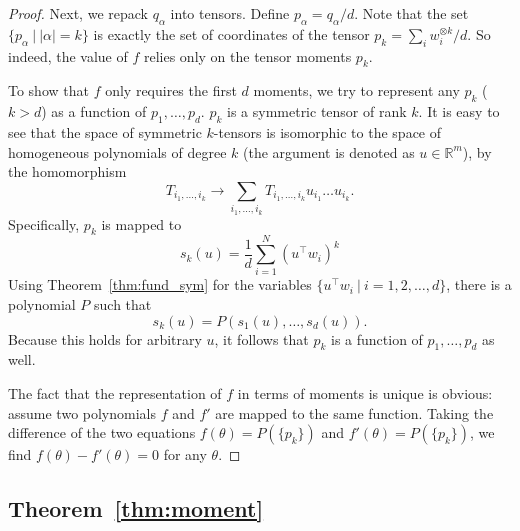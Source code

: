\documentclass{article}
\theoremstyle{plain}
\begin{document}
\begin{proof}
    Next, we repack $q_{\alpha}$ into tensors. Define $p_\alpha = q_\alpha/d$. Note that the set $\{ p_{\alpha} \ | \ |\alpha|=k \}$ is exactly the set of coordinates of the tensor $p_k = \sum_i w_i^{\otimes k}/d$. So indeed, the value of $f$ relies only on the tensor moments $p_k$. 

    To show that $f$ only requires the first $d$ moments, we try to represent any $p_k$ ($k>d$) as a function of $p_1,\dots, p_d$. $p_k$ is a symmetric tensor of rank $k$. It is easy to see that the space of symmetric $k$-tensors is isomorphic to the space of homogeneous polynomials of degree $k$ (the argument is denoted as $u\in\mathbb{R}^m$), by the homomorphism
    \begin{equation}
        T_{i_1,\dots, i_k} \to \sum_{i_1, \dots, i_k} T_{i_1,\dots, i_k} u_{i_1} \dots u_{i_k}    .
    \end{equation}
    Specifically, $p_k$ is mapped to
    \begin{equation}
        s_k(u) = \frac{1}{d} \sum_{i=1}^N (u^\top w_i)^k
    \end{equation}
    Using Theorem~\ref{thm:fund_sym} for the variables $\{u^\top w_i \ | \ i=1,2,\dots,d \}$, there is a polynomial $P$ such that
    \begin{equation}
        s_k (u) = P(s_1(u), \dots, s_d(u))   .
    \end{equation}
    Because this holds for arbitrary $u$, it follows that $p_k$ is a function of $p_1, \dots, p_d$ as well. 

    The fact that the representation of $f$ in terms of moments is unique is obvious: assume two polynomials $f$ and $f'$ are mapped to the same function. Taking the difference of the two equations $f(\theta)=P(\{p_k\})$ and $f'(\theta)=P(\{p_k\})$, we find $f(\theta)-f'(\theta)=0$ for any $\theta$. 
\end{proof}


\subsection{Theorem~\ref{thm:moment}}
\end{document}

